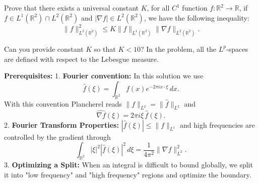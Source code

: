 \begin{exercise}
\label{analysis:2019:2}
Prove that there exists a universal constant $K$, for all $C^1$ function $f:\mathbb{R}^2\to\mathbb{R}$, if $f\in L^1(\mathbb{R}^2)\cap L^2(\mathbb{R}^2)$ and $|\nabla f|\in L^2(\mathbb{R}^2)$, we have the following inequality:
\[
\|f\|_{L^2(\mathbb{R}^2)}^2 \leq K\|f\|_{L^1(\mathbb{R}^2)}\|\nabla f\|_{L^2(\mathbb{R}^2)}.
\]

Can you provide constant $K$ so that $K<10$? In the problem, all the $L^p$-spaces are defined with respect to the Lebesgue measure.
\end{exercise}

\begin{solution}
\textbf{Prerequisites:}
1. \textbf{Fourier convention:} In this solution we use
\[
\widehat f(\xi)=\int_{\mathbb{R}^2}f(x)e^{-2\pi ix\cdot\xi}\,dx.
\]
With this convention Plancherel reads $\|f\|_{L^2}=\|\widehat f\|_{L^2}$ and
\[
\widehat{\nabla f}(\xi)=2\pi i\xi\,\widehat f(\xi).
\]
2. \textbf{Fourier Transform Properties:} $|\hat{f}(\xi)| \leq \|f\|_{L^1}$ and high frequencies are controlled by the gradient through
\[
\int_{\mathbb{R}^2}|\xi|^2|\widehat f(\xi)|^2\,d\xi
=\frac{1}{4\pi^2}\|\nabla f\|_{L^2}^2.
\]
3. \textbf{Optimizing a Split:} When an integral is difficult to bound globally, we split it into "low frequency" and "high frequency" regions and optimize the boundary.


\end{solution}
